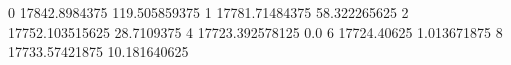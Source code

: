 0 17842.8984375 119.505859375
1 17781.71484375 58.322265625
2 17752.103515625 28.7109375
4 17723.392578125 0.0
6 17724.40625 1.013671875
8 17733.57421875 10.181640625
